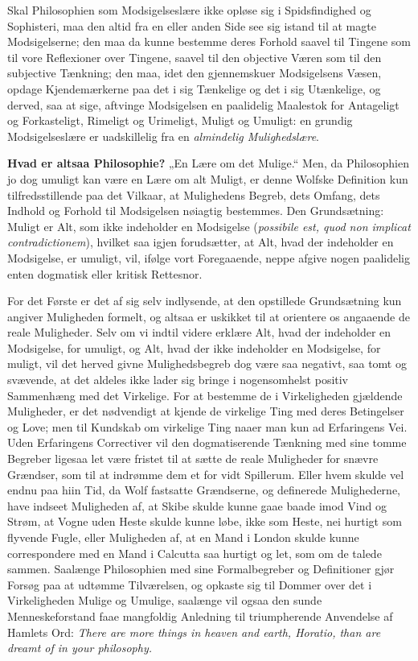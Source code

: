 \documentclass[12pt,a4paper]{book}
\begin{document}
Skal Philosophien som Modsigelseslære ikke opløse sig i Spidsfindighed
og Sophisteri, maa den altid fra en eller anden Side see sig istand
til at magte Modsigelserne; den maa da kunne bestemme deres Forhold
saavel til Tingene som til vore Reflexioner over Tingene, saavel til
den objective Væren som til den subjective Tænkning; den maa, idet den
gjennemskuer Modsigelsens Væsen, opdage Kjendemærkerne paa det i sig
Tænkelige og det i sig Utænkelige, og derved, saa at sige, aftvinge
Modsigelsen en paalidelig Maalestok for Antageligt og Forkasteligt,
Rimeligt og Urimeligt, Muligt og Umuligt: en grundig Modsigelseslære
er uadskillelig fra en \emph{almindelig Mulighedslære}.

\textbf{Hvad er altsaa Philosophie?} „En Lære om det Mulige.“ Men, da
Philosophien jo dog umuligt kan være en Lære om alt Muligt, er denne
Wolfske Definition kun tilfredsstillende paa det Vilkaar, at
Mulighedens Begreb, dets Omfang, dets Indhold og Forhold til
Modsigelsen nøiagtig bestemmes. Den Grundsætning: Muligt er Alt, som
ikke indeholder en Modsigelse (\textit{possibile est, quod non
implicat contradictionem}), hvilket saa igjen forudsætter, at Alt,
hvad der indeholder en
Modsigelse, er umuligt, vil, ifølge vort Foregaaende, neppe afgive
nogen paalidelig enten dogmatisk eller kritisk Rettesnor.

For det Første er det af sig selv indlysende, at den opstillede
Grundsætning kun angiver Muligheden formelt, og altsaa er uskikket til
at orientere os angaaende de reale Muligheder. Selv om vi indtil
videre erklære Alt, hvad der indeholder en Modsigelse, for umuligt, og
Alt, hvad der ikke indeholder en Modsigelse, for muligt, vil det
herved givne Mulighedsbegreb dog være saa negativt, saa tomt og
svævende, at det aldeles ikke lader sig bringe i nogensomhelst positiv
Sammenhæng med det Virkelige. For at bestemme de i Virkeligheden
gjældende Muligheder, er det nødvendigt at kjende de virkelige Ting
med deres Betingelser og Love; men til Kundskab om virkelige Ting
naaer man kun ad Erfaringens Vei. Uden Erfaringens Correctiver vil
den dogmatiserende Tænkning med sine tomme Begreber ligesaa let være
fristet til at sætte de reale Muligheder for snævre Grændser, som til
at indrømme dem et for vidt Spillerum. Eller hvem skulde vel endnu
paa hiin Tid, da Wolf fastsatte Grændserne, og definerede
Mulighederne, have indseet Muligheden af, at Skibe skulde kunne gaae
baade imod Vind og Strøm, at Vogne uden Heste skulde kunne løbe, ikke
som Heste, nei hurtigt som flyvende Fugle, eller Muligheden af, at en
Mand i London skulde kunne correspondere med en Mand i Calcutta saa
hurtigt og let, som om de talede sammen. Saalænge Philosophien med
sine Formalbegreber og Definitioner gjør Forsøg paa at udtømme
Tilværelsen, og opkaste sig til Dommer over det i Virkeligheden Mulige
og Umulige, saalænge vil ogsaa den sunde Menneskeforstand faae
mangfoldig Anledning til triumpherende Anvendelse af Hamlets Ord:
\textit{There are more things in heaven and earth, Horatio, than are
dreamt of in your philosophy.}
\end{document}
